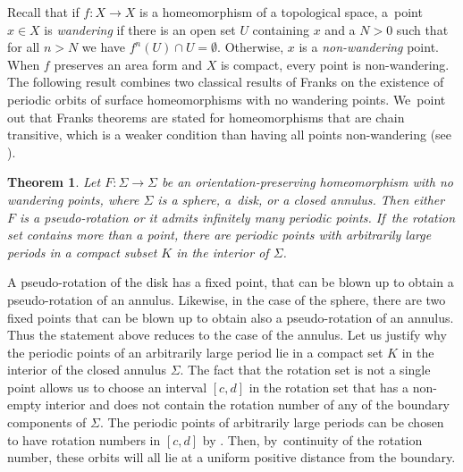 \documentclass[JEP,XML,SOM,Unicode,NoEqCountersInSection,NoFloatCountersInSection,published]{cedram}
\newtheorem{theorem}{Theorem}[section]
\theoremstyle{definition}
\begin{document}
Recall that if $f:X\to X$ is a homeomorphism of a topological space, a~point $x\in X$ is \emph{wandering} if there is an open set $U$ containing $x$ and a $N>0$ such that for all $n>N$ we have $f^n(U)\cap U=\emptyset$. Otherwise, $x$ is a \emph{non-wandering} point. When $f$ preserves an area form and $X$ is compact, every point is non-wandering. The following result combines two classical results of Franks \cite{F1, F2} on the existence of periodic orbits of surface homeomorphisms with no wandering points. We~point out that Franks theorems are stated for homeomorphisms that are chain transitive, which is a weaker condition than having all points non-wandering (see \cite[Prop.\,1.2]{F1}).

\begin{theorem}\label{thm:Fk}
Let $F:\Sigma \rightarrow \Sigma$ be an orientation-preserving homeomorphism with no wandering points, where $\Sigma$ is a sphere, a~disk, or a closed annulus. Then either~$F$ is a pseudo-rotation or it admits infinitely many periodic points. If~the rotation set contains more than a point, there are periodic points with arbitrarily large periods in a compact subset $K$ in the interior of $\Sigma$.
\end{theorem}

{A pseudo-rotation of the disk has a fixed point, that can be blown up to obtain a pseudo-rotation of an annulus. Likewise, in the case of the sphere, there are two fixed points that can be blown up to obtain also a pseudo-rotation of an annulus. Thus the statement above reduces to the case of the annulus.}{ Let us justify why the periodic points of an arbitrarily large period lie in a compact set $K$ in the interior of the closed annulus $\Sigma$. The fact that the rotation set is not a single point allows us to choose an interval $[c,d]$ in the rotation set that has a non-empty interior and does not contain the rotation number of any of the boundary components of $\Sigma$. The periodic points of arbitrarily large periods can be chosen to have rotation numbers in $[c,d]$ by \cite[Cor.\,2.4]{F1}. Then, by~continuity of the rotation number, these orbits will all lie at a uniform positive distance from the boundary.}
\end{document}
